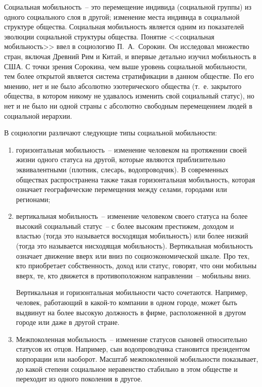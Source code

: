   \medskip

  Социальная мобильность~-- это перемещение индивида (социальной группы) из
  одного социального слоя в другой; изменение места индивида в социальной
  структуре общества. Социальная мобильность является одним из показателей
  эволюции социальной структуры общества. Понятие <<социальная мобильность>>
  ввел в социологию П.~А.~Сорокин. Он исследовал множество стран, включая
  Древний Рим и Китай, и впервые детально изучил мобильность в США. С точки
  зрения Сорокина, чем выше уровень социальной мобильности, тем более открытой
  является система стратификации в данном обществе. По его мнению, нет и не
  было абсолютно эзотерического общества (т.~е. закрытого общества, в котором
  никому не удавалось изменить свой социальный статус), но нет и не было ни
  одной страны с абсолютно свободным перемещением людей в социальной иерархии.

  В социологии различают следующие типы социальной мобильности:
  \begin{enumerate}
    \item	горизонтальная мобильность~-- изменение человеком на протяжении своей
      жизни одного статуса на другой, которые являются приблизительно
      эквивалентными (плотник, слесарь, водопроводчик). В современных обществах
      распространена также такая горизонтальная мобильность, которая означает
      географические перемещения между селами, городами или регионами;
    \item вертикальная мобильность~-- изменение человеком своего статуса на
      более высокий социальный статус~-- с более высоким престижем, доходом и
      властью (тогда это называется восходящая мобильность) или более низкий
      (тогда это называется нисходящая мобильность). Вертикальная мобильность
      означает движение вверх или вниз по социоэкономической шкале. Про тех,
      кто приобретает собственность, доход или статус, говорят, что они
      мобильны вверх, те, кто движется в противоположном направлении~--
      мобильны вниз.

      Вертикальная и горизонтальная мобильности часто сочетаются. Например,
      человек, работающий в какой-то компании в одном городе, может быть
      выдвинут на более высокую должность в фирме, расположенной в другом
      городе или даже в другой стране.
    \item Межпоколенная мобильность~-- изменение статусов сыновей относительно
      статусов их отцов. Например, сын водопроводчика становится президентом
      корпорации или наоборот. Масштаб межпоколенной мобильности показывает, до
      какой степени социальное неравенство стабильно в этом обществе и
      переходит из одного поколения в другое.
  \end{enumerate}

